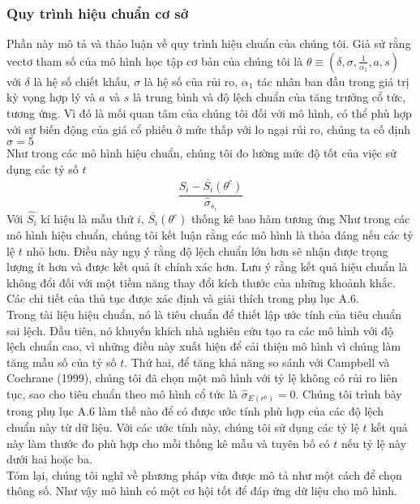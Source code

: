 \documentclass[10pt,a4paper]{article}
\begin{document}
	\subsubsection{Quy trình hiệu chuẩn cơ sở}
	Phần này mô tả và thảo luận về quy trình hiệu chuẩn của chúng tôi. Giả sử
	rằng vectơ tham số của mô hình học tập cơ bản của chúng tôi là $\theta\equiv(\delta,\sigma,\frac{1}{\alpha_1},a,s)$ với $\delta$ là hệ số chiết khấu, $\sigma$ là hệ số  của rủi ro, $\alpha_1$ tác nhân ban đầu trong giá trị kỳ vọng hợp lý và $a$ và $s$ là trung bình và độ lệch chuẩn của tăng trưởng cổ tức, tương ứng. Vì đó là mối quan tâm của chúng tôi đối với  mô hình, có thể phù hợp với sự biến động của giá cổ phiếu ở mức thấp với lo ngại rủi ro, chúng ta cố định $\sigma=5$\\
	Như trong các mô hình hiệu chuẩn, chúng tôi đo lường mức độ tốt của việc sử dụng
	các tỷ số $t$
	\begin{equation}
	\frac{\hat{S_i}-\bar{S_i}(\theta^c)}{\hat{\sigma}_{s_i}}
	\end{equation}
	Với $\hat{S_i}$ kí hiệu là mẫu thứ $i$, $\bar{S_i}(\theta^c)$ thống kê bao hàm tương ứng Như trong các mô hình hiệu chuẩn, chúng tôi kết luận rằng các mô hình là thỏa đáng nếu các tỷ lệ $t$ nhỏ hơn. Điều này ngụ ý rằng độ lệch chuẩn lớn hơn sẽ nhận được trọng lượng ít hơn và được kết quả ít chính xác hơn. Lưu ý rằng kết quả hiệu chuẩn là không đổi đối với một tiềm năng thay đổi kích thước của những khoảnh khắc. Các chi tiết của thủ tục được xác định và giải thích trong phụ lục A.6.\\
	Trong tài liệu hiệu chuẩn, nó là tiêu chuẩn để thiết lập ước tính của tiêu chuẩn sai lệch. Đầu tiên, nó khuyến khích nhà nghiên cứu tạo ra các mô hình với độ lệch chuẩn cao, vì những điều này xuất hiện để cải thiện mô hình vì chúng làm tăng mẫu số của tỷ số $t$. 
	Thứ hai, để tăng khả năng so sánh với Campbell và Cochrane (1999), chúng tôi
	đã chọn một mô hình với tỷ lệ không có rủi ro liên tục, sao cho tiêu chuẩn theo mô hình cổ tức là $\hat{\sigma}_{E(r^b)}=0$. Chúng tôi trình bày trong phụ lục A.6
	làm thế nào để có được ước tính phù hợp của các độ lệch chuẩn này từ dữ liệu.
	Với các ước tính này, chúng tôi sử dụng các tỷ lệ $t$ kết quả này làm thước đo phù hợp cho
	mỗi thống kê mẫu và tuyên bố có $t$ nếu tỷ lệ này dưới hai hoặc ba.\\
	
	Tóm lại, chúng tôi nghĩ về phương pháp vừa được mô tả như một cách để chọn thông số. Như vậy mô hình có một cơ hội tốt để đáp ứng dữ liệu cho mô hình.
\end{document}
